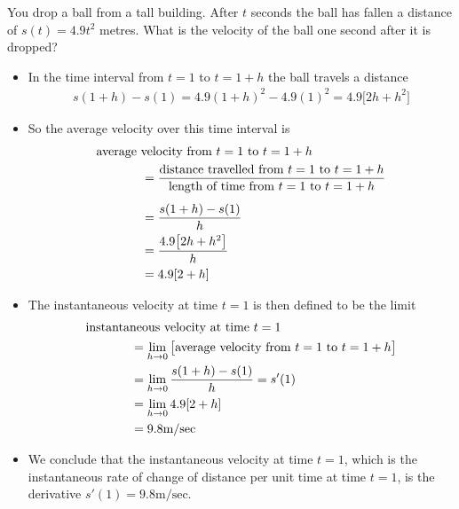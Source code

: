 \begin{eg}\label{eg:DIFFfirstVelocity}
You drop a ball from a tall building. After $t$ seconds the ball has fallen
a distance of $s(t)=4.9 t^2$ metres. What is the velocity of the ball one
second after it is dropped?

\begin{itemize}
 \item In the time interval from $t=1$ to $t=1+h$ the ball travels
a distance
\begin{align*}
s(1+h)-s(1)=4.9 (1+h)^2 - 4.9 (1)^2
           =4.9\big[2h+h^2\big]
\end{align*}
\item So the average velocity over this time interval is
\begin{align*}
&\text{average velocity from $t=1$ to $t=1+h$} \\
&\hskip0.5in=\frac{\text{distance travelled from $t=1$ to $t=1+h$}}
       {\text{length of time from $t=1$ to $t=1+h$}} \\[5pt]
&\hskip0.5in=\frac{s(1+h)-s(1)}{h} \\
&\hskip0.5in=\frac{4.9\big[2h+h^2\big]}{h} \\
&\hskip0.5in=4.9[2+h]
\end{align*}
\item The instantaneous velocity at time $t=1$ is then defined to be the limit
\begin{align*}
&\text{instantaneous velocity at time $t=1$} \\
&\hskip0.5in=\lim_{h\rightarrow 0}
\big[\text{average velocity from $t=1$ to $t=1+h$}\big]\\
&\hskip0.5in=\lim_{h\rightarrow 0}\frac{s(1+h)-s(1)}{h} = s'(1) \\
&\hskip0.5in= \lim_{h\rightarrow 0} 4.9[2+h] \\
&\hskip0.5in= 9.8\text{m/sec}
\end{align*}
\item We conclude that the instantaneous velocity at time $t=1$,
which is the instantaneous rate of change of distance per unit time
at time $t=1$, is the derivative  $s'(1)=9.8\text{m/sec}$.
\end{itemize}

\end{eg}

